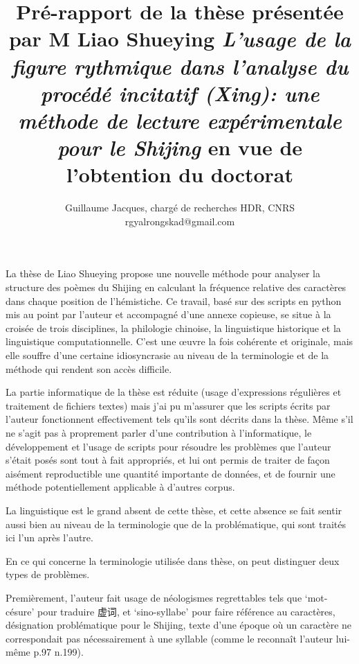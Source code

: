\documentclass[oldfontcommands,oneside,a4paper,11pt]{article}
\newcommand{\zh}[1]{{\cn #1}}
\begin{document}
 
\title{Pré-rapport de la thèse présentée par M Liao Shueying \textit{L'usage de la figure rythmique dans l'analyse du procédé incitatif (Xing): une méthode de lecture expérimentale pour le Shijing} en vue de l'obtention du doctorat }
\author{Guillaume Jacques, chargé de recherches HDR, CNRS\\rgyalrongskad@gmail.com}
\maketitle

La thèse de Liao Shueying propose une nouvelle méthode pour analyser la structure des poèmes du Shijing en calculant la fréquence relative des caractères dans chaque position de l'hémistiche. Ce travail, basé sur des scripts en python mis au point par l'auteur et accompagné d'une annexe copieuse, se situe à la croisée de trois disciplines, la philologie chinoise, la linguistique historique et la linguistique computationnelle. C'est une œuvre la fois cohérente et originale, mais elle souffre d'une certaine idiosyncrasie au niveau de la terminologie et de la méthode qui rendent son accès difficile. 

La partie informatique de la thèse est réduite (usage d'expressions régulières et traitement de fichiers textes) mais j'ai pu m'assurer que les scripts écrits par l'auteur fonctionnent effectivement tels qu'ils sont décrits dans la thèse. Même s'il ne s'agit pas à proprement parler d'une contribution à l'informatique, le développement et l'usage de scripts pour résoudre les problèmes que l'auteur s'était posés sont tout à fait appropriés, et lui ont permis de traiter de façon aisément reproductible une quantité importante de données, et de fournir une méthode potentiellement applicable à d'autres corpus.

La linguistique est le grand absent de cette thèse, et cette absence se fait sentir aussi bien au niveau de la terminologie que de la problématique, qui sont traités ici l'un après l'autre.

En ce qui concerne la terminologie utilisée dans thèse, on peut distinguer deux types de problèmes. 

Premièrement, l'auteur fait usage de néologismes regrettables tels que `mot-césure' pour traduire \zh{虚词}, et `sino-syllabe' pour faire référence au caractères, désignation problématique pour le Shijing, texte d'une époque où un caractère ne correspondait pas nécessairement à une syllable (comme le reconnaît l'auteur lui-même p.97 n.199). 
\end{document}
